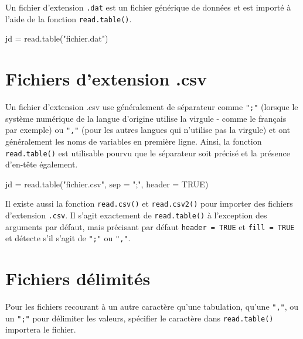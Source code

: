 \documentclass[
]{book}
\newenvironment{Shaded}{}{}
\newcommand{\AttributeTok}[1]{#1}
\newcommand{\ConstantTok}[1]{#1}
\newcommand{\FunctionTok}[1]{#1}
\newcommand{\NormalTok}[1]{#1}
\newcommand{\OtherTok}[1]{#1}
\newcommand{\StringTok}[1]{#1}
\begin{document}
Un fichier d'extension \texttt{.dat} est un fichier générique de données et est importé à l'aide de la fonction \texttt{read.table()}.

\begin{Shaded}
\begin{Highlighting}[]
\NormalTok{jd }\OtherTok{=} \FunctionTok{read.table}\NormalTok{(}\StringTok{"fichier.dat"}\NormalTok{)}
\end{Highlighting}
\end{Shaded}

\hypertarget{fichiers-dextension-.csv}{%
\section{Fichiers d'extension .csv}\label{fichiers-dextension-.csv}}

Un fichier d'extension .csv use généralement de séparateur comme \texttt{";"} (lorsque le système numérique de la langue d'origine utilise la virgule - comme le français par exemple) ou \texttt{","} (pour les autres langues qui n'utilise pas la virgule) et ont généralement les noms de variables en première ligne. Ainsi, la fonction \texttt{read.table()} est utilisable pourvu que le séparateur soit précisé et la présence d'en-tête également.

\begin{Shaded}
\begin{Highlighting}[]
\NormalTok{jd }\OtherTok{=} \FunctionTok{read.table}\NormalTok{(}\StringTok{"fichier.csv"}\NormalTok{, }\AttributeTok{sep =} \StringTok{";"}\NormalTok{, }\AttributeTok{header =} \ConstantTok{TRUE}\NormalTok{)}
\end{Highlighting}
\end{Shaded}

Il existe aussi la fonction \texttt{read.csv()} et \texttt{read.csv2()} pour importer des fichiers d'extension \texttt{.csv}. Il s'agit exactement de \texttt{read.table()} à l'exception des arguments par défaut, mais précisant par défaut \texttt{header\ =\ TRUE} et \texttt{fill\ =\ TRUE} et détecte s'il s'agit de \texttt{";"} ou \texttt{","}.

\hypertarget{fichiers-duxe9limituxe9s}{%
\section{Fichiers délimités}\label{fichiers-duxe9limituxe9s}}

Pour les fichiers recourant à un autre caractère qu'une tabulation, qu'une \texttt{","}, ou un \texttt{";"} pour délimiter les valeurs, spécifier le caractère dans \texttt{read.table()} importera le fichier.
\end{document}
